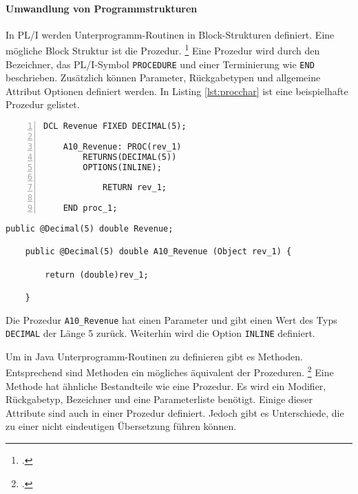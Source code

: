 \paragraph{Umwandlung von Programmstrukturen }\label{programstruct}

In PL/I werden Unterprogramm-Routinen in Block-Strukturen definiert. Eine mögliche Block Struktur ist die Prozedur. \footcite[Vgl. ][S. 97ff. ]{pliref}
Eine Prozedur wird durch den Bezeichner, das PL/I-Symbol \verb+PROCEDURE+ und einer Terminierung wie \verb+END+ beschrieben.
Zusätzlich können Parameter, Rückgabetypen und allgemeine Attribut Optionen definiert werden. In Listing \ref{lst:procchar} ist eine beispielhafte Prozedur gelistet.

\begin{minipage}[b]{0.48\linewidth}
	\centering
	\lstset{language=PL/I,label=SliceExaple}
	\begin{lstlisting}[frame=single, numbers=left, mathescape,%
		caption={Prozeduren}, label={lst:procchar}]
	DCL Revenue FIXED DECIMAL(5);

	A10_Revenue: PROC(rev_1) 
		RETURNS(DECIMAL(5)) 
		OPTIONS(INLINE);
			
			RETURN rev_1;
	
	END proc_1;
	\end{lstlisting}
\end{minipage}
\hspace{0.5cm}
\begin{minipage}[b]{0.48\linewidth}
	\centering
	\lstset{language=Java,label=SliceExaple}
	\begin{lstlisting}[frame=single, mathescape,%
		title={" "}]
	public @Decimal(5) double Revenue;
		
	public @Decimal(5) double A10_Revenue (Object rev_1) { 
		
		return (double)rev_1;
	
	}
	\end{lstlisting}
\end{minipage}

Die Prozedur \verb+A10_Revenue+ hat einen Parameter und gibt einen Wert des Typs \verb+DECIMAL+ der L\"ange 5 zur\"uck.
Weiterhin wird die Option \verb+INLINE+ definiert.

Um in Java Unterprogramm-Routinen zu definieren gibt es Methoden. 
Entsprechend sind Methoden ein mögliches äquivalent der Prozeduren. \footcite[Vgl. ][]{oracle}
Eine Methode hat ähnliche Bestandteile wie eine Prozedur.
Es wird ein Modifier, Rückgabetyp, Bezeichner und eine Parameterliste benötigt.
Einige dieser Attribute sind auch in einer Prozedur definiert.
Jedoch gibt es Unterschiede, die zu einer nicht eindeutigen Übersetzung führen können.

